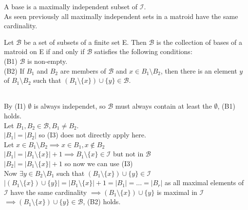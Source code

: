 \documentclass[../main.tex]{subfiles}
\begin{document}
 
\begin{defn}
A base is a maximally independent subset of $\mathcal{I}.$\\
\noindent As seen previously all maximally independent sets in a matroid have the same cardinality.
\end{defn}

\begin{thm}
 Let $\mathcal{B}$ be a set of subsets of a finite set E. Then $\mathcal{B}$ is the collection of bases of a matroid on E if and only if $\mathcal{B}$ satisfies the following conditions:\\
 (B1) $\mathcal{B}$ is non-empty.\\
 (B2) If $B_1$ and $B_2$ are members of $\mathcal{B}$ and $x \in B_1 \setminus B_2$, then there is an element $y$ of $B_1 \setminus B_2$ such that $(B_1 \setminus \{x\}) \cup \{y\} \in \mathcal{B}$.
 \end{thm}

\noindent \Proof \\
\noindent By (I1) $\emptyset$ is always independet, so $\mathcal{B}$ must always contain at least the $\emptyset$, (B1) holds.\\
\noindent Let $B_1 ,B_2 \in \mathcal{B}, B_1 \neq B_2.$ \\
\noindent $|B_1| = |B_2|$ so (I3) does not directly apply here.\\
\noindent Let $x \in B_1 \setminus B_2 \implies x \in B_1, x \notin B_2$\\
\noindent $|B_1| = |B_1 \setminus \{x\}| + 1 \implies B_1 \setminus \{x\} \in \mathcal{I}$ but not in $\mathcal{B}$\\
\noindent $|B_2| = |B_1 \setminus \{x\}| + 1$ so now we can use (I3)\\
\noindent Now $\exists y \in B_2 \setminus B_1$ such that $(B_1 \setminus \{x\}) \cup \{y\} \in \mathcal{I}$\\
$|(B_1 \setminus \{x\}) \cup \{y\}| = |B_1 \setminus \{x\}| + 1 = |B_1| = ... = |B_r|$ as all maximal elements of $\mathcal{I}$ have the same cardinality $\implies (B_1 \setminus \{x\}) \cup \{y\}$ is maximal in $\mathcal{I}$\\
$\implies (B_1 \setminus \{x\}) \cup \{y\} \in \mathcal{B}$, (B2) holds.

\vspace{4mm}
\end{document}

